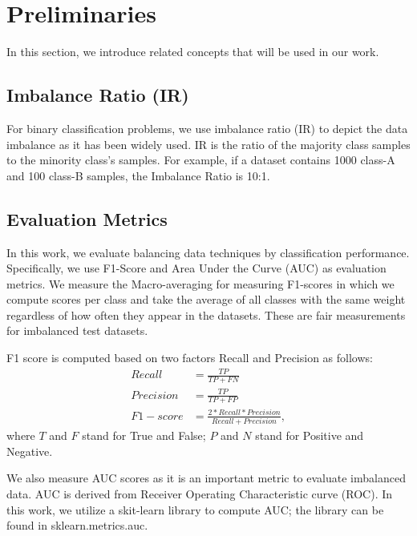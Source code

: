 \documentclass[journal]{IEEEtai}
\begin{document}
\section{Preliminaries}
\label{sec:preliminaries}       
In this section, we introduce related concepts that will be used in our work. 

\subsection{Imbalance Ratio (IR)}
For binary classification problems, we use imbalance ratio (IR) to depict the data imbalance as it has been widely used. IR is the ratio of the majority class samples to the minority class's samples. For example, if a dataset contains 1000 class-A and 100 class-B samples, the Imbalance Ratio is 10:1.   

\subsection{Evaluation Metrics}
\label{f1score}
In this work, we evaluate balancing data techniques by classification performance. Specifically, we use F1-Score and Area Under the Curve (AUC) as evaluation metrics. We measure the Macro-averaging for measuring F1-scores in which we compute scores per class and take the average of all classes with the same weight regardless of how often they appear in the datasets. These are fair measurements for imbalanced test datasets. 

F1 score is computed based on two factors Recall and Precision as follows:\\
\begin{align}
	Recall &= \frac{TP}{TP+FN}\\
	Precision &= \frac{TP}{TP+FP}\\
	F1-score &= \frac{2*Recall*Precision}{Recall+Precision},
\end{align}
where $T$ and $F$ stand for True and False; $P$ and $N$ stand for Positive and Negative. 

We also measure AUC \cite{cite:AUC} scores as it is an important metric to evaluate imbalanced data. AUC is derived from Receiver Operating Characteristic curve (ROC). In this work, we utilize a skit-learn library to compute AUC; the library can be found in sklearn.metrics.auc. 
\end{document}
